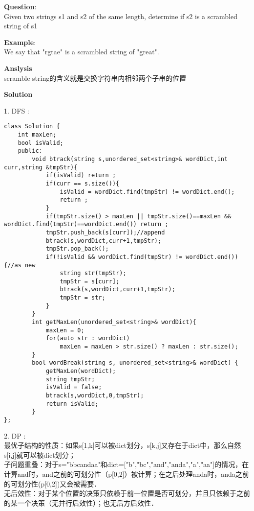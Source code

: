     
\begin{description}
   \item{\textbf{Question}}:\\%
	    Given two strings s1 and s2 of the same length, determine if s2 is a scrambled string of s1\\

    \item{\textbf{Example}}:\\
		We say that "rgtae" is a scrambled string of "great".

    \item{\textbf{Anslysis}}\\
		scramble string的含义就是交换字符串内相邻两个子串的位置

    \item{\textbf{Solution}}\\
	\item{1. DFS} : \\
		\begin{lstlisting}
class Solution {
	int maxLen;
	bool isValid;
	public:
		void btrack(string s,unordered_set<string>& wordDict,int curr,string &tmpStr){
			if(isValid) return ;
			if(curr == s.size()){
				isValid = wordDict.find(tmpStr) != wordDict.end();
				return ;
			}
			if(tmpStr.size() > maxLen || tmpStr.size()==maxLen && wordDict.find(tmpStr)==wordDict.end()) return ;
			tmpStr.push_back(s[curr]);//append
			btrack(s,wordDict,curr+1,tmpStr);
			tmpStr.pop_back();
			if(!isValid && wordDict.find(tmpStr) != wordDict.end()){//as new
				string str(tmpStr);
				tmpStr = s[curr];
				btrack(s,wordDict,curr+1,tmpStr);
				tmpStr = str;
			}
		}
		int getMaxLen(unordered_set<string>& wordDict){
			maxLen = 0;
			for(auto str : wordDict)
				maxLen = maxLen > str.size() ? maxLen : str.size();
		}
		bool wordBreak(string s, unordered_set<string>& wordDict) {
			getMaxLen(wordDict);
			string tmpStr;
			isValid = false;
			btrack(s,wordDict,0,tmpStr);
			return isValid;
		}
};
		\end{lstlisting}

	\item{2. DP} : \\
		最优子结构的性质：如果s[1,k]可以被dict划分，s[k,j]又存在于dict中，那么自然s[i,j]就可以被dict划分；\\
		子问题重叠：对于s="bbcandaa"和dict=["b","bc","and","anda","a","aa"]的情况，在计算and时，and之前的可划分性（p[0,2]）被计算；在之后处理anda时，anda之前的可划分性(p[0,2])又会被需要．\\
		无后效性：对于某个位置的决策只依赖于前一位置是否可划分，并且只依赖于之前的某一个决策（无并行后效性）；也无后方后效性．\\


\end{description}
